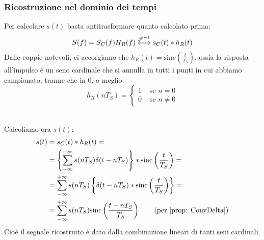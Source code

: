 \subsubsection{Ricostruzione nel dominio dei tempi}
Per calcolare $s(t)$ basta antitrasformare quanto calcolato prima:
\begin{equation}
    S(f) = S_C(f)H_R(f) \overset{{\mathscr{F}}^{-1}}{\longleftrightarrow}  s_C(t) \ast h_R(t)
\end{equation}
Dalle coppie notevoli, ci accorgiamo che $h_R(t) = \text{sinc}\left(\frac{t}{T_S}\right)$, ossia la risposta all'impulso è un 
seno cardinale che si annulla in tutti i punti in cui abbiamo campionato, tranne che in 0, o meglio:
\begin{equation}
    h_R(nT_S) = \begin{cases}
        1 & \text{ se } n = 0\\
        0 & \text{ se } n \neq 0
    \end{cases}
\end{equation}\\

Calcoliamo ora $s(t)$:
\begin{align*}
    s(t) &= s_C(t) \ast h_R(t) = \\
         &= \left\{ \sum_{-\infty}^{+\infty} s(nT_S) \delta(t - nT_S)\right\} \ast \text{sinc}\left(\frac{t}{T_S}\right) = \\
         &= \sum_{-\infty}^{+\infty} s(nT_S)\left\{  \delta(t - nT_S) \ast \text{sinc}\left(\frac{t}{T_S}\right)\right\} = \\ 
         &= \sum_{-\infty}^{+\infty} s(nT_S) \text{sinc}\left(\frac{t - nT_S}{T_S}\right) \tag{per \eqref{prop: ConvDelta}}
\end{align*}
Cioè il segnale ricostruito è dato dalla combinazione lineari di tanti seni cardinali.

